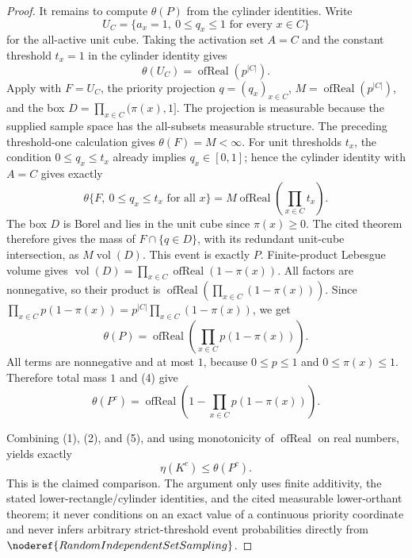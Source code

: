 \begin{proof}
It remains to compute \(\theta(P)\) from the cylinder identities.  Write
\[
U_C=\{a_x=1,\ 0\le q_x\le1\text{ for every }x\in C\}
\]
for the all-active unit cube.  Taking the activation set \(A=C\) and the
constant threshold \(t_x=1\) in the cylinder identity gives
\[
\theta(U_C)=\operatorname{ofReal}(p^{|C|}).
\]
Apply 
with \(F=U_C\), the priority projection \(q=(q_x)_{x\in C}\),
\(M=\operatorname{ofReal}(p^{|C|})\), and the box
\(D=\prod_{x\in C}(\pi(x),1]\).
The projection is measurable because the supplied sample space has the
all-subsets measurable structure.  The preceding threshold-one calculation
gives \(\theta(F)=M<\infty\).  For unit thresholds \(t_x\), the condition
\(0\le q_x\le t_x\) already implies \(q_x\in[0,1]\); hence the cylinder
identity with \(A=C\) gives exactly
\[
\theta\{F,\ 0\le q_x\le t_x\text{ for all }x\}
=M\operatorname{ofReal}\left(\prod_{x\in C}t_x\right).
\]
The box \(D\) is Borel and lies in the unit cube since \(\pi(x)\ge0\).
The cited theorem therefore gives the mass of \(F\cap\{q\in D\}\),
with its redundant unit-cube intersection, as \(M\operatorname{vol}(D)\).
This event is exactly \(P\).  Finite-product Lebesgue volume gives
\(\operatorname{vol}(D)=\prod_{x\in C}\operatorname{ofReal}(1-\pi(x))\).
All factors are nonnegative, so their product is
\(\operatorname{ofReal}(\prod_{x\in C}(1-\pi(x)))\).  Since
\(\prod_{x\in C}p(1-\pi(x))=p^{|C|}\prod_{x\in C}(1-\pi(x))\), we get
\[
\theta(P)=
\operatorname{ofReal}\!\left(\prod_{x\in C}p(1-\pi(x))\right).
\tag{4}
\]
All terms are nonnegative and at most \(1\), because \(0\le p\le1\) and
\(0\le\pi(x)\le1\).  Therefore total mass \(1\) and (4) give
\[
\theta(P^c)=
\operatorname{ofReal}\!\left(
1-\prod_{x\in C}p(1-\pi(x))\right).
\tag{5}
\]

Combining (1), (2), and (5), and using monotonicity of
\(\operatorname{ofReal}\) on real numbers, yields exactly
\[
\eta(K^c)\le\theta(P^c).
\]
This is the claimed comparison.  The argument only uses finite additivity,
the stated lower-rectangle/cylinder identities, and the cited measurable
lower-orthant theorem; it never conditions on an exact value of a continuous
priority coordinate and never infers arbitrary strict-threshold event
probabilities directly from \(\noderef{RandomIndependentSetSampling}\).
\end{proof}
